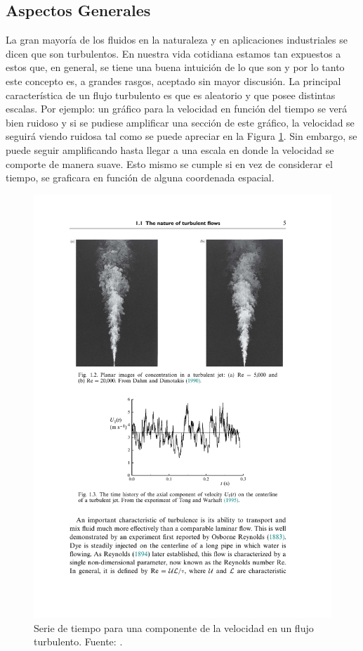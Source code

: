 \subsection{Aspectos Generales}
La gran mayoría de los fluidos en la naturaleza y en aplicaciones industriales se dicen que son turbulentos. En nuestra vida cotidiana estamos tan expuestos a estos que, en general, se tiene una buena intuición de lo que son y por lo tanto este concepto es, a grandes rasgos, aceptado sin mayor discusión. La principal característica de un flujo turbulento es que es aleatorio y que posee distintas escalas. Por ejemplo: un gráfico para la velocidad en función del tiempo se verá bien ruidoso y si se pudiese amplificar una sección de este gráfico, la velocidad se seguirá viendo ruidosa tal como se puede apreciar en la Figura \ref{fig:03_turbulent}. Sin embargo, se puede seguir amplificando hasta llegar a una escala en donde la velocidad se comporte de manera suave. Esto mismo se cumple si en vez de considerar el tiempo, se graficara en función de alguna coordenada espacial.

\begin{figure}[h!]
	\centering
	\includegraphics[width=0.8\linewidth,trim={4.3cm 7.7cm 4cm 11.5cm},clip]{Imagenes/03/turbulent}
	\caption{Serie de tiempo para una componente de la velocidad en un flujo turbulento. Fuente: \cite{pope2000turbulent}.}
	\label{fig:03_turbulent}
\end{figure}

